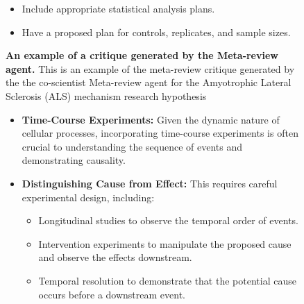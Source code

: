 \begin{figure}[htbp!]
\begin{tcolorbox}
\begin{itemize}
\begin{itemize}
        \item Include appropriate statistical analysis plans.
        \item Have a proposed plan for controls, replicates, and sample sizes.
    \end{itemize}
\end{itemize}
\end{tcolorbox}
\vspace{0.1cm}
\caption{\textbf{An example of a critique generated by the Meta-review agent.} This is an example of the meta-review critique generated by the the co-scientist Meta-review agent for the Amyotrophic Lateral Sclerosis (ALS) mechanism research hypothesis}
\label{fig:ex_meta_critique}
\end{figure}

\begin{figure}[htbp!]
\begin{tcolorbox}[
    colback=black!5!white,
    colframe=black!60!white,
    title=\textbf{Example output of a critique by the Meta-review agent (continued)},
    fonttitle=\bfseries,
    arc=3mm,
    boxrule=1pt,
    bottomrule=2pt,
]
\footnotesize
\begin{itemize}
    \item \textbf{Time-Course Experiments:} Given the dynamic nature of cellular processes, incorporating time-course experiments is often crucial to understanding the sequence of events and demonstrating causality.
    \item \textbf{Distinguishing Cause from Effect:} This requires careful experimental design, including:
    \begin{itemize}
        \item Longitudinal studies to observe the temporal order of events.
        \item Intervention experiments to manipulate the proposed cause and observe the effects downstream.
        \item Temporal resolution to demonstrate that the potential cause occurs before a downstream event.
    \end{itemize}
\end{itemize}


\end{tcolorbox}
\end{figure}
